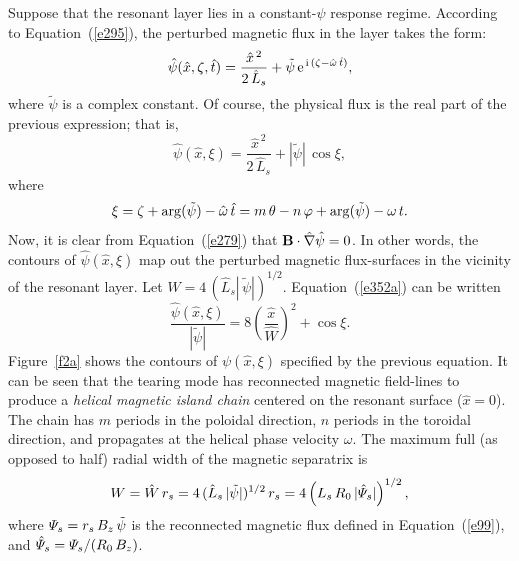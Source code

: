 \documentclass[notitlepage,12pt]{article}
\begin{document}
Suppose that the resonant layer lies in a constant-$\psi$ response regime. According to Equation~(\ref{e295}),
the perturbed magnetic flux in the layer takes the form:
\begin{equation}
\hat{\psi}(\hat{x},\zeta,\hat{t}) = \frac{\hat{x}^{\,2} }{2\,\hat{L}_s}+ \tilde{\psi}\,{\rm e}^{\,{\rm i}\,(\zeta-\hat{\omega}\,\hat{t})},
\end{equation}
where $\tilde{\psi}$ is a complex constant. Of course, the physical flux is the real part of the previous expression; that is,
\begin{equation}\label{e352a}
\hat{\psi}(\hat{x},\xi)= \frac{\hat{x}^{\,2} }{2\,\hat{L}_s}+ |\tilde{\psi}|\,\cos\xi,
\end{equation}
where
\begin{equation}
\xi = \zeta +{\rm arg}(\tilde{\psi})-\hat{\omega}\,\hat{t} = m\,\theta-n\,\varphi +{\rm arg}(\tilde{\psi}) -\omega\,t.
\end{equation}
Now, it is clear from Equation~(\ref{e279}) that ${\bf B}\cdot\hat{\nabla}\hat{\psi}=0$. In other words, the contours of
$\hat{\psi}(\hat{x},\xi)$ map out the perturbed magnetic flux-surfaces in the vicinity of the resonant layer. 
Let $\hat{W} = 4\,(\hat{L}_s|\,\tilde{\psi}|)^{1/2}$. Equation~(\ref{e352a}) can be written
\begin{equation}
\frac{\hat{\psi}(\hat{x},\xi)}{|\tilde{\psi}|} = 8\left(\frac{\hat{x}}{\hat{W}}\right)^2 + \cos\xi.
\end{equation}
Figure~\ref{f2a} shows the contours of $\psi(\hat{x},\xi)$ specified by the previous equation. It can be seen that the
tearing mode has reconnected magnetic field-lines to produce a {\em helical magnetic island chain}\/ centered on the resonant
surface ($\hat{x}=0$). The chain has $m$ periods in the poloidal direction, $n$ periods in the toroidal direction, and propagates at the
helical phase velocity $\omega$. The maximum full (as opposed to half) radial width of the magnetic separatrix is 
\begin{equation}\label{e355s}
W =  \hat{W}\,r_s= 4\,(\hat{L}_s\,|\tilde{\psi}|)^{1/2}\,r_s = 4\left(L_s\,R_0\,|\hat{\mit\Psi}_s|\right)^{1/2},
\end{equation}
where ${\mit\Psi}_s = r_s\,B_z\,\tilde{\psi}$ is the reconnected magnetic flux defined in Equation~(\ref{e99}), and
$\hat{\mit\Psi}_s= {\mit\Psi}_s/(R_0\,B_z)$. 
\end{document}
